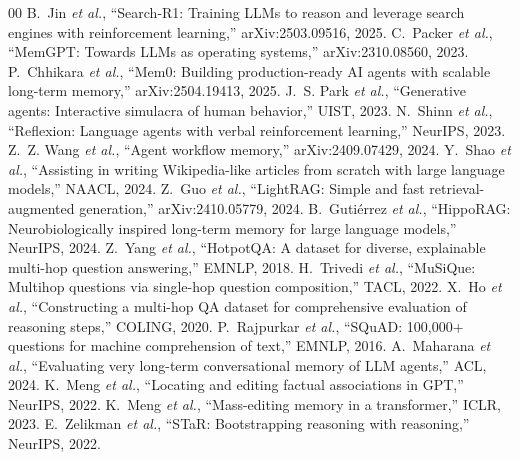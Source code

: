\documentclass[conference]{IEEEtran}
\begin{document}
\begin{thebibliography}{00}
 B.~Jin \emph{et al.}, ``Search-R1: Training LLMs to reason
and leverage search engines with reinforcement learning,'' arXiv:2503.09516,
2025.
 C.~Packer \emph{et al.}, ``MemGPT: Towards LLMs as operating
systems,'' arXiv:2310.08560, 2023.
 P.~Chhikara \emph{et al.}, ``Mem0: Building production-ready
AI agents with scalable long-term memory,'' arXiv:2504.19413, 2025.
 J.~S. Park \emph{et al.}, ``Generative agents:
Interactive simulacra of human behavior,'' UIST, 2023.
 N.~Shinn \emph{et al.}, ``Reflexion: Language agents with
verbal reinforcement learning,'' NeurIPS, 2023.
 Z.~Z. Wang \emph{et al.}, ``Agent workflow memory,''
arXiv:2409.07429, 2024.
 Y.~Shao \emph{et al.}, ``Assisting in writing Wikipedia-like
articles from scratch with large language models,'' NAACL, 2024.
 Z.~Guo \emph{et al.}, ``LightRAG: Simple and fast
retrieval-augmented generation,'' arXiv:2410.05779, 2024.
 B.~Guti\'errez \emph{et al.}, ``HippoRAG:
Neurobiologically inspired long-term memory for large language models,''
NeurIPS, 2024.
 Z.~Yang \emph{et al.}, ``HotpotQA: A dataset for diverse,
explainable multi-hop question answering,'' EMNLP, 2018.
 H.~Trivedi \emph{et al.}, ``MuSiQue: Multihop questions via
single-hop question composition,'' TACL, 2022.
 X.~Ho \emph{et al.}, ``Constructing a multi-hop QA dataset
for comprehensive evaluation of reasoning steps,'' COLING, 2020.
 P.~Rajpurkar \emph{et al.}, ``SQuAD: 100,000+ questions for
machine comprehension of text,'' EMNLP, 2016.
 A.~Maharana \emph{et al.}, ``Evaluating very long-term
conversational memory of LLM agents,'' ACL, 2024.
 K.~Meng \emph{et al.}, ``Locating and editing factual
associations in GPT,'' NeurIPS, 2022.
 K.~Meng \emph{et al.}, ``Mass-editing memory in a
transformer,'' ICLR, 2023.
 E.~Zelikman \emph{et al.}, ``STaR: Bootstrapping reasoning
with reasoning,'' NeurIPS, 2022.
\end{thebibliography}
\end{document}
